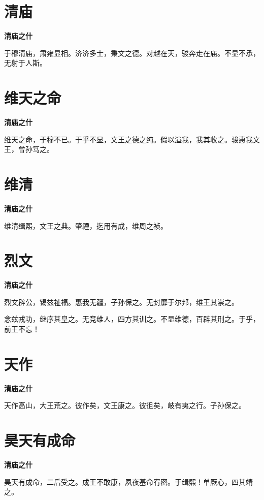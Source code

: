 \documentclass[12pt,a4paper]{ctexbook}
\begin{document}
\section{清庙}
\textbf{清庙之什}\par\vspace{0.5em}
于穆清庙，肃雍显相。济济多士，秉文之德。对越在天，骏奔走在庙。不显不承，无射于人斯。\par

\section{维天之命}
\textbf{清庙之什}\par\vspace{0.5em}
维天之命，于穆不已。于乎不显，文王之德之纯。假以溢我，我其收之。骏惠我文王，曾孙笃之。\par

\section{维清}
\textbf{清庙之什}\par\vspace{0.5em}
维清缉熙，文王之典。肇禋，迄用有成，维周之祯。\par

\section{烈文}
\textbf{清庙之什}\par\vspace{0.5em}
烈文辟公，锡兹祉福。惠我无疆，子孙保之。无封靡于尔邦，维王其崇之。\par
念兹戎功，继序其皇之。无竞维人，四方其训之。不显维德，百辟其刑之。于乎，前王不忘！\par

\section{天作}
\textbf{清庙之什}\par\vspace{0.5em}
天作高山，大王荒之。彼作矣，文王康之。彼徂矣，岐有夷之行。子孙保之。\par

\section{昊天有成命}
\textbf{清庙之什}\par\vspace{0.5em}
昊天有成命，二后受之。成王不敢康，夙夜基命宥密。于缉熙！单厥心，四其靖之。\par
\end{document}
